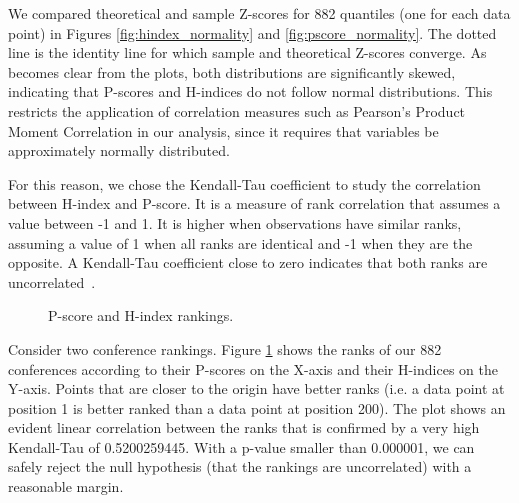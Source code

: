 \documentclass[man]{apa6}
\let \cite \parencite
\begin{document}
We compared theoretical and sample Z-scores for 882 quantiles (one for each data point) in Figures
\ref{fig:hindex_normality} and \ref{fig:pscore_normality}. The dotted line is the identity line for
which sample and theoretical Z-scores converge. As becomes clear from the plots, both distributions
are significantly skewed, indicating that P-scores and H-indices do not follow normal
distributions. This restricts the application of correlation measures such as Pearson's Product 
Moment Correlation in our analysis, since it requires that variables be approximately normally 
distributed. 

For this reason, we chose the Kendall-Tau coefficient to
study the correlation 
between H-index and P-score. It is a measure of rank
correlation that assumes a value between
-1 and 1. It is higher when observations have similar
ranks, assuming a value of 1
when all ranks are identical and -1 when they are the
opposite. A Kendall-Tau coefficient close to zero indicates
that both ranks are uncorrelated~\cite{Kendall1955, Baeza-Yates2011}.

\begin{figure}[h!]
  \begin{center}
    \caption{P-score and H-index rankings.}
    \label{fig:pscore_hindex_ranks}
  \end{center}
\end{figure}

Consider two conference rankings. Figure \ref{fig:pscore_hindex_ranks} shows the ranks of our 882 conferences according to
their P-scores
on the X-axis and their H-indices on the Y-axis. Points that are closer to the origin have better ranks (i.e. a data point at position 1 is better ranked than a data point at position 200).
The plot shows an evident linear correlation between the ranks that is confirmed
by a very high Kendall-Tau of 0.5200259445. With a p-value smaller than 0.000001, we can safely reject the null 
hypothesis (that the rankings are uncorrelated) with a reasonable margin.
\end{document}
